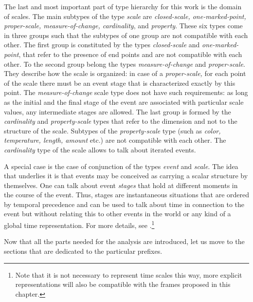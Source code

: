 The last and most important part of type hierarchy for this work is the domain of scales. The main subtypes of the type \textit{scale} are \textit{closed-scale, one-marked-point, proper-scale, measure-of-change, cardinality}, and \textit{property}. These six types come in three groups such that the subtypes of one group are not compatible with each other. The first group is constituted by the types \textit{closed-scale} and \textit{one-marked-point}, that refer to the presence of end points and are not compatible with each other. To the second group belong the types \textit{measure-of-change} and \textit{proper-scale}. They describe how the scale is organized: in case of a \textit{proper-scale,} for each point of the scale there must be an event stage that is characterized exactly by this point. The \textit{measure-of-change} scale type does not have such requirements: as long as the initial and the final stage of the event are associated with particular scale values, any intermediate stages are allowed. The last group is formed by the \textit{cardinality} and \textit{property-scale} types that refer to the dimension and not to the structure of the scale. Subtypes of the \textit{property-scale} type (such as \textit{color, temperature, length, amount} etc.) are not compatible with each other. The \textit{cardinality} type of the scale allows to talk about iterated events.

A special case is the case of conjunction of the types \textit{event} and \textit{scale}. The idea that underlies it is that events may be conceived as carrying a scalar structure by themselves. One can talk about event \emph{stages} that hold at different moments in the course of the event. Thus, stages are instantaneous situations that are ordered by temporal precedence and can be used to talk about time in connection to the event but without relating this to other events in the world or any kind of a global time representation. For more details, see \citet{ZinovaOsswald:paper}.\footnote{Note that it is not necessary to represent time scales this way, more explicit representations will also be compatible with the frames proposed in this chapter.}

Now that all the parts needed for the analysis are introduced, let us move to the sections that are dedicated to the particular prefixes.

